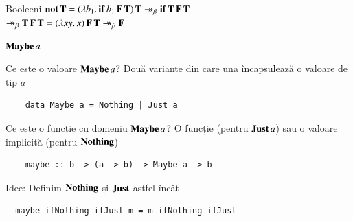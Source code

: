 \documentclass[xcolor=pdftex,romanian,colorlinks]{beamer}
\begin{document}
\begin{frame}{Booleeni}
$\mathbf{not}\, \mathbf{T} = (\lambda b_1.\,\mathbf{if}\, b_1\, \mathbf{F}\, \mathbf{T})\, \mathbf{T} \twoheadrightarrow_\beta \mathbf{if}\, \mathbf{T}\, \mathbf{F}\, \mathbf{T}$ \\
\hspace{1.2cm} $\twoheadrightarrow_\beta \mathbf{T}\, \mathbf{F}\, \mathbf{T} = (\lambda xy.\,x)\, \mathbf{F}\, \mathbf{T} \twoheadrightarrow_\beta \mathbf{F} $

\end{frame}

\begin{frame}[fragile]{$\mathop{\mathbf{Maybe}}{a}$}

\begin{block}{Ce este o valoare $\mathop{\mathbf{Maybe}}{a}$?}
		Două variante din care una încapsulează o valoare de tip $a$
	\begin{lstlisting}
	data Maybe a = Nothing | Just a
	\end{lstlisting}
\end{block}

\begin{block}{Ce este o funcție cu domeniu $\mathop{\mathbf{Maybe}}{a}$?}
		O funcție (pentru $\mathbf{Just}\, a$) sau o valoare implicită (pentru $\mathbf{Nothing}$)
	\begin{lstlisting}
	maybe :: b -> (a -> b) -> Maybe a -> b
	\end{lstlisting}
\end{block}

\begin{block}{Idee:
	Definim $\mathbf{Nothing}$ și $\mathbf{Just}$ astfel încât}
	\begin{lstlisting}
  maybe ifNothing ifJust m = m ifNothing ifJust
	\end{lstlisting}
\end{block}
\end{frame}
\end{document}
